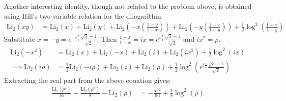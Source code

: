 Another interesting identity, though not related to the problem above, is obtained using Hill's two-variable relation for the dilogarithm:
\begin{align*}
\text{Li}_2(xy) &= \text{Li}_2(x) + \text{Li}_2(y) + \text{Li}_2\left(-x\left(\frac{1-y}{1-x}\right) \right)+\text{Li}_2\left(-y\left(\frac{1-x}{1-y}\right)\right)+\frac{1}{2}\log^2\left(\frac{1-x}{1-y}\right)
\end{align*}
Substitute $x=-y = e^{-i\frac{\pi}{4}}\frac{\sqrt{3}-1}{\sqrt{2}}$. Then $\frac{1-x}{1+x}=ix = e^{i\frac{\pi}{4}}\frac{\sqrt{3}-1}{\sqrt{2}}$ and $ix^2 =\rho$.
\begin{align*}
\text{Li}_2(-x^2) &= \text{Li}_2(x) + \text{Li}_2(-x) + \text{Li}_2(i)+\text{Li}_2(ix^2)+\frac{1}{2}\log^2\left(ix\right) \\
\implies \text{Li}_2(i\rho)&= \frac{1}{2}\text{Li}_2(-i\rho)+ \text{Li}_2(i) + \text{Li}_2(\rho) +\frac{1}{2}\log^2\left(e^{i\frac{\pi}{4}}\frac{\sqrt{3}-1}{\sqrt{2}} \right)
\end{align*}
Extracting the real part from the above equation gives:
\begin{align*}
\frac{\text{Li}_2(\rho^4)}{16}-\frac{\text{Li}_2(\rho^2)}{8} -\text{Li}_2(\rho) &= -\frac{5\pi^2}{96}+\frac{1}{8}\log^2(\rho) 
\end{align*}
